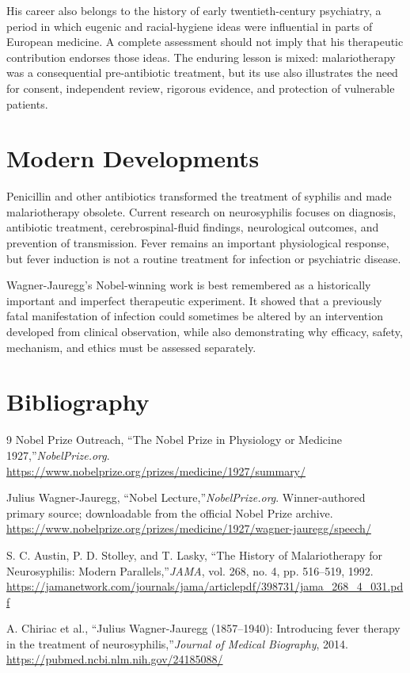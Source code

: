 His career also belongs to the history of early twentieth-century psychiatry, a period in which eugenic and racial-hygiene ideas were influential in parts of European medicine. A complete assessment should not imply that his therapeutic contribution endorses those ideas. The enduring lesson is mixed: malariotherapy was a consequential pre-antibiotic treatment, but its use also illustrates the need for consent, independent review, rigorous evidence, and protection of vulnerable patients.

\section{Modern Developments}

Penicillin and other antibiotics transformed the treatment of syphilis and made malariotherapy obsolete. Current research on neurosyphilis focuses on diagnosis, antibiotic treatment, cerebrospinal-fluid findings, neurological outcomes, and prevention of transmission. Fever remains an important physiological response, but fever induction is not a routine treatment for infection or psychiatric disease.

Wagner-Jauregg's Nobel-winning work is best remembered as a historically important and imperfect therapeutic experiment. It showed that a previously fatal manifestation of infection could sometimes be altered by an intervention developed from clinical observation, while also demonstrating why efficacy, safety, mechanism, and ethics must be assessed separately.

\section{Bibliography}

\begin{thebibliography}{9}
Nobel Prize Outreach, ``The Nobel Prize in Physiology or Medicine 1927,''\emph{NobelPrize.org}.\newline
\url{https://www.nobelprize.org/prizes/medicine/1927/summary/}

Julius Wagner-Jauregg, ``Nobel Lecture,''\emph{NobelPrize.org}. Winner-authored primary source; downloadable from the official Nobel Prize archive.\newline
\url{https://www.nobelprize.org/prizes/medicine/1927/wagner-jauregg/speech/}

S. C. Austin, P. D. Stolley, and T. Lasky, ``The History of Malariotherapy for Neurosyphilis: Modern Parallels,''\emph{JAMA}, vol. 268, no. 4, pp. 516--519, 1992.\newline
\url{https://jamanetwork.com/journals/jama/articlepdf/398731/jama_268_4_031.pdf}

A. Chiriac et al., ``Julius Wagner-Jauregg (1857--1940): Introducing fever therapy in the treatment of neurosyphilis,''\emph{Journal of Medical Biography}, 2014.\newline
\url{https://pubmed.ncbi.nlm.nih.gov/24185088/}
\end{thebibliography}
